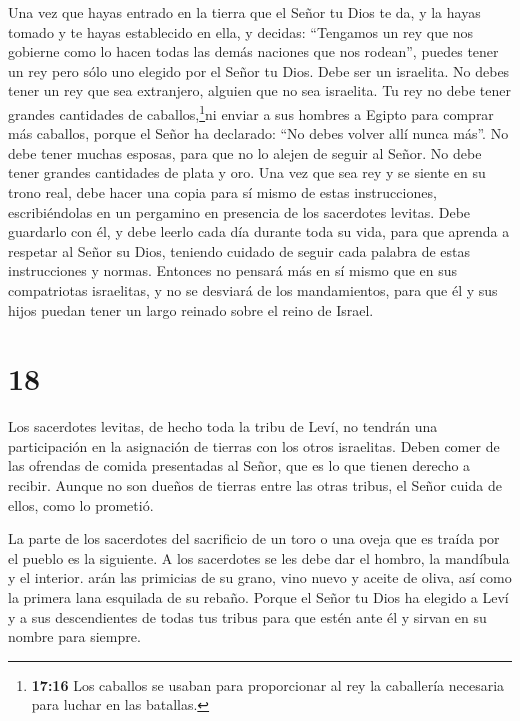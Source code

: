  Una vez que hayas entrado en la tierra que el Señor tu
Dios te da, y la hayas tomado y te hayas establecido en ella, y decidas:
``Tengamos un rey que nos gobierne como lo hacen todas las demás
naciones que nos rodean'',  puedes tener un rey pero sólo
uno elegido por el Señor tu Dios. Debe ser un israelita. No debes tener
un rey que sea extranjero, alguien que no sea israelita. 
Tu rey no debe tener grandes cantidades de caballos,\footnote{\textbf{17:16}
  Los caballos se usaban para proporcionar al rey la caballería
  necesaria para luchar en las batallas.}ni enviar a sus hombres a
Egipto para comprar más caballos, porque el Señor ha declarado: ``No
debes volver allí nunca más''.  No debe tener muchas
esposas, para que no lo alejen de seguir al Señor. No debe tener grandes
cantidades de plata y oro.  Una vez que sea rey y se siente
en su trono real, debe hacer una copia para sí mismo de estas
instrucciones, escribiéndolas en un pergamino en presencia de los
sacerdotes levitas.  Debe guardarlo con él, y debe leerlo
cada día durante toda su vida, para que aprenda a respetar al Señor su
Dios, teniendo cuidado de seguir cada palabra de estas instrucciones y
normas.  Entonces no pensará más en sí mismo que en sus
compatriotas israelitas, y no se desviará de los mandamientos, para que
él y sus hijos puedan tener un largo reinado sobre el reino de Israel.

\hypertarget{section-17}{%
\section{18}\label{section-17}}

 Los sacerdotes levitas, de hecho toda la tribu de Leví, no
tendrán una participación en la asignación de tierras con los otros
israelitas. Deben comer de las ofrendas de comida presentadas al Señor,
que es lo que tienen derecho a recibir.  Aunque no son
dueños de tierras entre las otras tribus, el Señor cuida de ellos, como
lo prometió.

 La parte de los sacerdotes del sacrificio de un toro o una
oveja que es traída por el pueblo es la siguiente. A los sacerdotes se
les debe dar el hombro, la mandíbula y el interior.  arán
las primicias de su grano, vino nuevo y aceite de oliva, así como la
primera lana esquilada de su rebaño.  Porque el Señor tu
Dios ha elegido a Leví y a sus descendientes de todas tus tribus para
que estén ante él y sirvan en su nombre para siempre.


